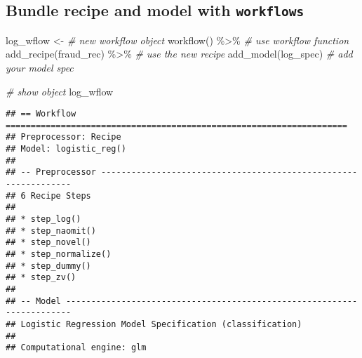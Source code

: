 \documentclass[
]{article}
\newenvironment{Shaded}{\begin{snugshade}}{\end{snugshade}}
\newcommand{\CommentTok}[1]{\textcolor[rgb]{0.56,0.35,0.01}{\textit{#1}}}
\newcommand{\FunctionTok}[1]{\textcolor[rgb]{0.00,0.00,0.00}{#1}}
\newcommand{\NormalTok}[1]{#1}
\newcommand{\OtherTok}[1]{\textcolor[rgb]{0.56,0.35,0.01}{#1}}
\newcommand{\SpecialCharTok}[1]{\textcolor[rgb]{0.00,0.00,0.00}{#1}}
\begin{document}
\hypertarget{bundle-recipe-and-model-with-workflows}{%
\subsection{\texorpdfstring{Bundle recipe and model with
\texttt{workflows}}{Bundle recipe and model with workflows}}\label{bundle-recipe-and-model-with-workflows}}

\begin{Shaded}
\begin{Highlighting}[]
\NormalTok{log\_wflow }\OtherTok{\textless{}{-}} \CommentTok{\# new workflow object}
 \FunctionTok{workflow}\NormalTok{() }\SpecialCharTok{\%\textgreater{}\%} \CommentTok{\# use workflow function}
 \FunctionTok{add\_recipe}\NormalTok{(fraud\_rec) }\SpecialCharTok{\%\textgreater{}\%}   \CommentTok{\# use the new recipe}
 \FunctionTok{add\_model}\NormalTok{(log\_spec)   }\CommentTok{\# add your model spec}

\CommentTok{\# show object}
\NormalTok{log\_wflow}
\end{Highlighting}
\end{Shaded}

\begin{verbatim}
## == Workflow ====================================================================
## Preprocessor: Recipe
## Model: logistic_reg()
## 
## -- Preprocessor ----------------------------------------------------------------
## 6 Recipe Steps
## 
## * step_log()
## * step_naomit()
## * step_novel()
## * step_normalize()
## * step_dummy()
## * step_zv()
## 
## -- Model -----------------------------------------------------------------------
## Logistic Regression Model Specification (classification)
## 
## Computational engine: glm
\end{verbatim}
\end{document}
